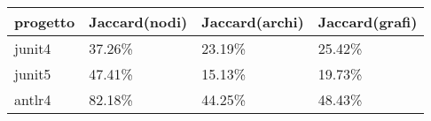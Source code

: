 \begin{center}
    \begin{tabular}{|l|l|l|l|}
        \hline
        progetto & Jaccard(nodi) & Jaccard(archi) & Jaccard(grafi) \\ \hline
        \hline
        \rowcolor[HTML]{FE0000} 
        junit4 & 37.26\% & 23.19\% & 25.42\% \\ \hline
        \rowcolor[HTML]{FE0000} 
        junit5 & 47.41\% & 15.13\% & 19.73\% \\ \hline
        \rowcolor[HTML]{F27805} 
        antlr4 & 82.18\% & 44.25\% & 48.43\% \\ \hline
    \end{tabular}
\end{center}


